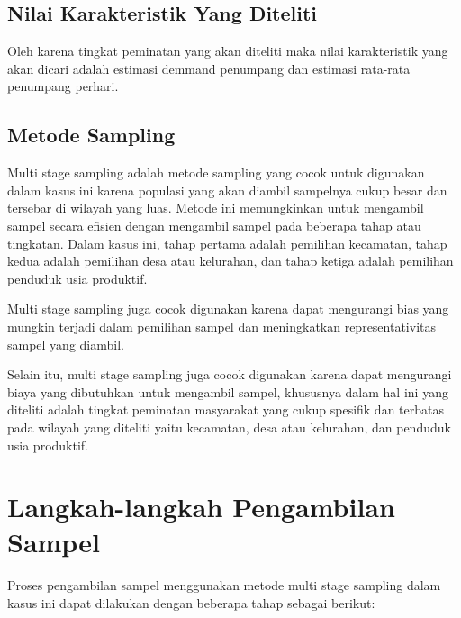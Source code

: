 \documentclass{article}
\begin{document}
\subsection{Nilai Karakteristik Yang Diteliti}
Oleh karena tingkat peminatan yang akan diteliti maka nilai karakteristik yang akan dicari adalah estimasi demmand penumpang dan estimasi rata-rata penumpang perhari.

\subsection{Metode Sampling}

Multi stage sampling adalah metode sampling yang cocok untuk digunakan dalam kasus ini karena populasi yang akan diambil sampelnya cukup besar dan tersebar di wilayah yang luas. Metode ini memungkinkan untuk mengambil sampel secara efisien dengan mengambil sampel pada beberapa tahap atau tingkatan. Dalam kasus ini, tahap pertama adalah pemilihan kecamatan, tahap kedua adalah pemilihan desa atau kelurahan, dan tahap ketiga adalah pemilihan penduduk usia produktif. \par

Multi stage sampling juga cocok digunakan karena dapat mengurangi bias yang mungkin terjadi dalam pemilihan sampel dan meningkatkan representativitas sampel yang diambil.

Selain itu, multi stage sampling juga cocok digunakan karena dapat mengurangi biaya yang dibutuhkan untuk mengambil sampel, khususnya dalam hal ini yang diteliti adalah tingkat peminatan masyarakat yang cukup spesifik dan terbatas pada wilayah yang diteliti yaitu kecamatan, desa atau kelurahan, dan penduduk usia produktif.

\section{Langkah-langkah Pengambilan Sampel}

Proses pengambilan sampel menggunakan metode multi stage sampling dalam kasus ini dapat dilakukan dengan beberapa tahap sebagai berikut:
\end{document}
